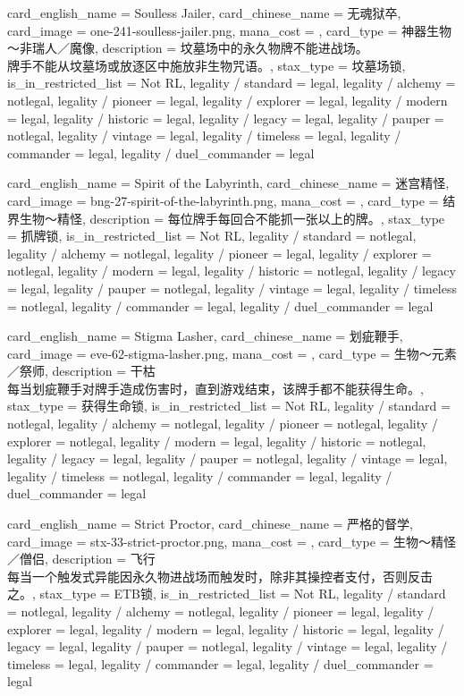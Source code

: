 \documentclass[lang = cn, color = black, 10pt]{AllThatStax}
\begin{document}
\card
{
	card_english_name = {Soulless Jailer},
	card_chinese_name = {无魂狱卒},
	card_image = one-241-soulless-jailer.png,
	mana_cost = ,
	card_type = 神器生物～非瑞人／魔像,
	description = {坟墓场中的永久物牌不能进战场。\\
牌手不能从坟墓场或放逐区中施放非生物咒语。},
	stax_type = 坟墓场锁,
	is_in_restricted_list = Not RL,
	legality / standard = legal,
	legality / alchemy = notlegal,
	legality / pioneer = legal,
	legality / explorer = legal,
	legality / modern = legal,
	legality / historic = legal,
	legality / legacy = legal,
	legality / pauper = notlegal,
	legality / vintage = legal,
	legality / timeless = legal,
	legality / commander = legal,
	legality / duel_commander = legal
}

\card
{
	card_english_name = {Spirit of the Labyrinth},
	card_chinese_name = {迷宫精怪},
	card_image = bng-27-spirit-of-the-labyrinth.png,
	mana_cost = ,
	card_type = 结界生物～精怪,
	description = {每位牌手每回合不能抓一张以上的牌。},
	stax_type = 抓牌锁,
	is_in_restricted_list = Not RL,
	legality / standard = notlegal,
	legality / alchemy = notlegal,
	legality / pioneer = legal,
	legality / explorer = notlegal,
	legality / modern = legal,
	legality / historic = notlegal,
	legality / legacy = legal,
	legality / pauper = notlegal,
	legality / vintage = legal,
	legality / timeless = notlegal,
	legality / commander = legal,
	legality / duel_commander = legal
}

\card
{
	card_english_name = {Stigma Lasher},
	card_chinese_name = {划疵鞭手},
	card_image = eve-62-stigma-lasher.png,
	mana_cost = ,
	card_type = 生物～元素／祭师,
	description = {干枯\\
每当划疵鞭手对牌手造成伤害时，直到游戏结束，该牌手都不能获得生命。},
	stax_type = 获得生命锁,
	is_in_restricted_list = Not RL,
	legality / standard = notlegal,
	legality / alchemy = notlegal,
	legality / pioneer = notlegal,
	legality / explorer = notlegal,
	legality / modern = legal,
	legality / historic = notlegal,
	legality / legacy = legal,
	legality / pauper = notlegal,
	legality / vintage = legal,
	legality / timeless = notlegal,
	legality / commander = legal,
	legality / duel_commander = legal
}

\card
{
	card_english_name = {Strict Proctor},
	card_chinese_name = {严格的督学},
	card_image = stx-33-strict-proctor.png,
	mana_cost = ,
	card_type = 生物～精怪／僧侣,
	description = {飞行\\
每当一个触发式异能因永久物进战场而触发时，除非其操控者支付，否则反击之。},
	stax_type = ETB锁,
	is_in_restricted_list = Not RL,
	legality / standard = notlegal,
	legality / alchemy = notlegal,
	legality / pioneer = legal,
	legality / explorer = legal,
	legality / modern = legal,
	legality / historic = legal,
	legality / legacy = legal,
	legality / pauper = notlegal,
	legality / vintage = legal,
	legality / timeless = legal,
	legality / commander = legal,
	legality / duel_commander = legal
}
\end{document}
